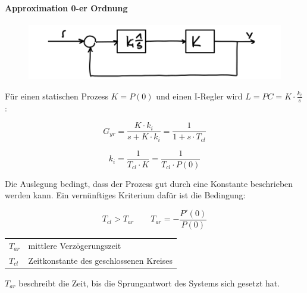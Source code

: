 \documentclass[
  10pt,
  a4paper,
]{article}
\makeatletter
\let\oldparagraph\paragraph
\renewcommand{\paragraph}[1]{\oldparagraph{#1}\mbox{}}
\numberwithin{equation}{section}
\newenvironment{conditions}
  {\par\vspace{\abovedisplayskip}\noindent\begin{tabular}{>{$}l<{$} @{${}:{}$} l}}
  {\end{tabular}\par\vspace{\belowdisplayskip}}
\let\paragraph\oldparagraph
\renewcommand{\paragraph}[1]{\oldparagraph{#1}\mbox{}\par}
\makeatother
\begin{document}
\begin{multicols}{2}
\hypertarget{approximation-0-er-ordnung}{%
\paragraph{Approximation 0-er
Ordnung}\label{approximation-0-er-ordnung}}

\begin{figure}[H]

{\centering \includegraphics{images/paste-31.png}

}

\end{figure}

Für einen statischen Prozess \(K=P(0)\) und einen I-Regler wird
\(L=PC=K\cdot\frac{k_i}{s}\):

\[
G_{yr}=\frac{K\cdot k_i}{s+K\cdot k_i}=\frac1{1+s\cdot T_{cl}}
\]

\[
k_i = \frac{1}{T_{cl}\cdot K}=\frac1{T_{cl}\cdot P(0)}
\]

\begin{tcolorbox}[enhanced jigsaw, coltitle=black, arc=.35mm, breakable, opacityback=0, opacitybacktitle=0.6, rightrule=.15mm, titlerule=0mm, bottomrule=.15mm, leftrule=.75mm, bottomtitle=1mm, colframe=quarto-callout-caution-color-frame, toprule=.15mm, colbacktitle=quarto-callout-caution-color!10!white, toptitle=1mm, title=\textcolor{quarto-callout-caution-color}{\faFire}\hspace{0.5em}{mittlere Verzögerungszeit}, left=2mm, colback=white]

Die Auslegung bedingt, dass der Prozess gut durch eine Konstante
beschrieben werden kann. Ein vernünftiges Kriterium dafür ist die
Bedingung:

\[
T_{cl}>T_{ar}\qquad T_{ar}=-\frac{P'(0)}{P(0)}
\]

\begin{conditions}
  T_{ar} & mittlere Verzögerungszeit \\
  T_{cl} & Zeitkonstante des geschlossenen Kreises
\end{conditions}

\(T_{ar}\) beschreibt die Zeit, bis die Sprungantwort des Systems sich
gesetzt hat.

\end{tcolorbox}


\end{multicols}
\end{document}
